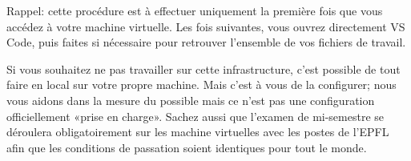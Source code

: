 \documentclass[10pt]{article}
\begin{document}
Rappel: cette procédure est à effectuer uniquement la première fois que vous accédez à votre machine virtuelle. Les fois suivantes, vous ouvrez directement VS Code, puis faites  si nécessaire pour retrouver l'ensemble de vos fichiers de travail.

Si vous souhaitez ne pas travailler sur cette infrastructure, c'est possible de tout faire en local sur votre propre machine. Mais c'est à vous de la configurer; nous vous aidons dans la mesure du possible mais ce n'est pas une configuration officiellement «prise en charge». Sachez aussi que l'examen de mi-semestre se déroulera obligatoirement sur les machine virtuelles avec les postes de l'EPFL afin que les conditions de passation soient identiques pour tout le monde.
\end{document}
